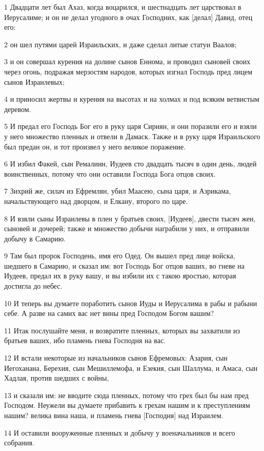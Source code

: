\par 1 Двадцати лет был Ахаз, когда воцарился, и шестнадцать лет царствовал в Иерусалиме; и он не делал угодного в очах Господних, как [делал] Давид, отец его:
\par 2 он шел путями царей Израильских, и даже сделал литые статуи Ваалов;
\par 3 и он совершал курения на долине сынов Еннома, и проводил сыновей своих через огонь, подражая мерзостям народов, которых изгнал Господь пред лицем сынов Израилевых;
\par 4 и приносил жертвы и курения на высотах и на холмах и под всяким ветвистым деревом.
\par 5 И предал его Господь Бог его в руку царя Сириян, и они поразили его и взяли у него множество пленных и отвели в Дамаск. Также и в руку царя Израильского был предан он, и тот произвел у него великое поражение.
\par 6 И избил Факей, сын Ремалиин, Иудеев сто двадцать тысяч в один день, людей воинственных, потому что они оставили Господа Бога отцов своих.
\par 7 Зихрий же, силач из Ефремлян, убил Маасею, сына царя, и Азрикама, начальствующего над дворцом, и Елкану, второго по царе.
\par 8 И взяли сыны Израилевы в плен у братьев своих, [Иудеев], двести тысяч жен, сыновей и дочерей; также и множество добычи награбили у них, и отправили добычу в Самарию.
\par 9 Там был пророк Господень, имя его Одед. Он вышел пред лице войска, шедшего в Самарию, и сказал им: вот Господь Бог отцов ваших, во гневе на Иудеев, предал их в руку вашу, и вы избили их с такою яростью, которая достигла до небес.
\par 10 И теперь вы думаете поработить сынов Иуды и Иерусалима в рабы и рабыни себе. А разве на самих вас нет вины пред Господом Богом вашим?
\par 11 Итак послушайте меня, и возвратите пленных, которых вы захватили из братьев ваших, ибо пламень гнева Господня на вас.
\par 12 И встали некоторые из начальников сынов Ефремовых: Азария, сын Иегоханана, Берехия, сын Мешиллемофа, и Езекия, сын Шаллума, и Амаса, сын Хадлая, против шедших с войны,
\par 13 и сказали им: не вводите сюда пленных, потому что грех был бы нам пред Господом. Неужели вы думаете прибавить к грехам нашим и к преступлениям нашим? велика вина наша, и пламень гнева [Господня] над Израилем.
\par 14 И оставили вооруженные пленных и добычу у военачальников и всего собрания.
